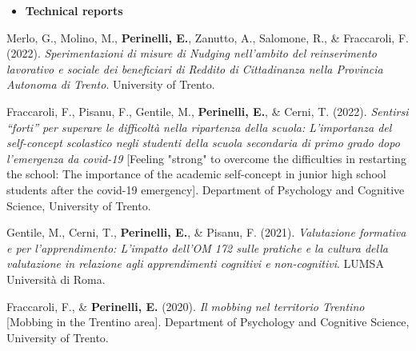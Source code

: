 \documentclass[hidelinks, letterpaper,10pt]{article} %
\begin{document}
\begin{itemize}
	\setlength{\topsep}{0pt}%
	\setlength{\leftmargin}{0.1in}%
	\setlength{\listparindent}{-0.1in}%
	\setlength{\itemindent}{-0.2in}%
	\setlength{\parsep}{\parskip}%
	
	\item {\textbf{\large{Technical reports}}}
\end{itemize}
\begin{etaremune}

    \item Merlo, G., Molino, M., \textbf{Perinelli, E.}, Zanutto, A., Salomone, R., \& Fraccaroli, F. (2022). \textit{Sperimentazioni di misure di Nudging nell’ambito del reinserimento lavorativo e sociale dei beneficiari di Reddito di Cittadinanza nella Provincia Autonoma di Trento}. University of Trento.
    
    \item Fraccaroli, F., Pisanu, F., Gentile, M., \textbf{Perinelli, E.}, \& Cerni, T. (2022). \textit{Sentirsi “forti” per superare le difficoltà nella ripartenza della scuola: L’importanza del self-concept scolastico negli studenti della scuola secondaria di primo grado dopo l’emergenza da covid-19} [Feeling "strong" to overcome the difficulties in restarting the school: The importance of the academic self-concept in junior high school students after the covid-19 emergency]. Department of Psychology and Cognitive Science, University of Trento. \\
	
	\item Gentile, M., Cerni, T., \textbf{Perinelli, E.}, \& Pisanu, F. (2021). \textit{Valutazione formativa e per l’apprendimento: L’impatto dell’OM 172 sulle pratiche e la cultura della valutazione in relazione agli apprendimenti cognitivi e non-cognitivi}. LUMSA Università di Roma.
	
	
	\item Fraccaroli, F., \& \textbf{Perinelli, E.} (2020). \textit{Il mobbing nel territorio Trentino} [Mobbing in the Trentino area]. Department of Psychology and Cognitive Science, University of Trento. 

\end{etaremune}
\vspace{3mm}
\end{document}
